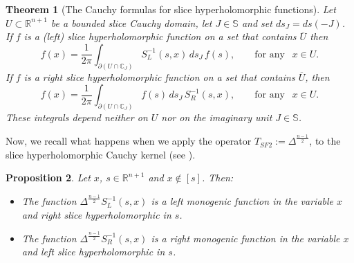 \documentclass[reqno,11pt]{amsart}
\numberwithin{equation}{section}
\newtheorem{theorem}{Theorem}[section]
\newtheorem{proposition}[theorem]{Proposition}
\theoremstyle{definition}
\begin{document}
\begin{theorem}[The Cauchy formulas for slice hyperholomorphic functions]
	\label{Cauchy}
	Let $U\subset\mathbb{R}^{n+1}$ be a bounded slice Cauchy domain, let $J\in\mathbb{S}$ and set  $ds_J=ds (-J)$.
	If $f$ is a (left) slice hyperholomorphic function on a set that contains $\overline{U}$ then
	\begin{equation}
		f(x)=\frac{1}{2 \pi}\int_{\partial (U\cap \mathbb{C}_J)} S_L^{-1}(s,x)\, ds_J\,  f(s),\qquad\text{for any }\ \  x\in U.
	\end{equation}
	If $f$ is a right slice hyperholomorphic function on a set that contains $\overline{U}$,
	then
	\begin{equation}\label{Cauchyright}
		f(x)=\frac{1}{2 \pi}\int_{\partial (U\cap \mathbb{C}_J)}  f(s)\, ds_J\, S_R^{-1}(s,x),\qquad\text{for any }\ \  x\in U.
	\end{equation}
	These integrals  depend neither on $U$ nor on the imaginary unit $J\in\mathbb{S}$.
\end{theorem}

Now, we recall what happens when we apply the operator $T_{SF2}:= \Delta^{\frac{n-1}2}$, to the slice hyperholomorphic Cauchy kernel (see \cite{CSS10}).











\begin{proposition}
	\label{reg}
	Let $x$, $s \in \mathbb{R}^{n+1}$ and $x \not\in [s]$. Then:
	\begin{itemize}
		\item
		The function $\Delta^{\frac{n-1}{2}} S_L^{-1}(s,x)$ is a left monogenic function in the variable $x$ and right slice hyperholomorphic in $s$.
		\item
		The function  $\Delta^{\frac{n-1}{2}} S_R^{-1}(s,x)$ is a right monogenic function in the variable $x$ and left slice hyperholomorphic in $s$.
	\end{itemize}
\end{proposition}
\end{document}
